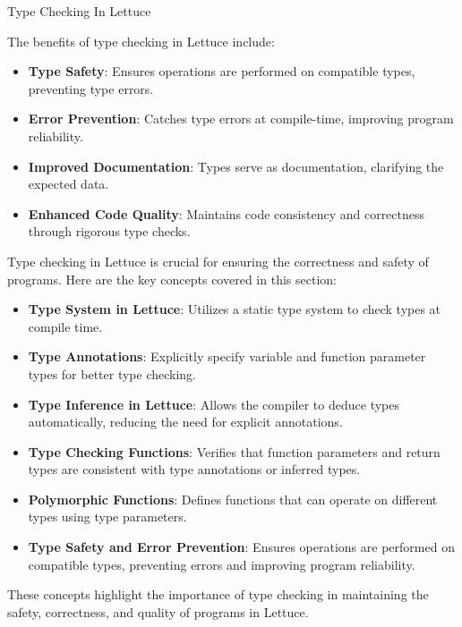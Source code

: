 \begin{notes}{Type Checking In Lettuce}
\begin{highlight}
        The benefits of type checking in Lettuce include:
    
        \begin{itemize}
            \item \textbf{Type Safety}: Ensures operations are performed on compatible types, preventing type errors.
            \item \textbf{Error Prevention}: Catches type errors at compile-time, improving program reliability.
            \item \textbf{Improved Documentation}: Types serve as documentation, clarifying the expected data.
            \item \textbf{Enhanced Code Quality}: Maintains code consistency and correctness through rigorous type checks.
        \end{itemize}
    
    \end{highlight}
    
    \begin{highlight}
    
        Type checking in Lettuce is crucial for ensuring the correctness and safety of programs. Here are the key concepts covered in this section:
    
        \begin{itemize}
            \item \textbf{Type System in Lettuce}: Utilizes a static type system to check types at compile time.
            \item \textbf{Type Annotations}: Explicitly specify variable and function parameter types for better type checking.
            \item \textbf{Type Inference in Lettuce}: Allows the compiler to deduce types automatically, reducing the need for explicit annotations.
            \item \textbf{Type Checking Functions}: Verifies that function parameters and return types are consistent with type annotations or inferred types.
            \item \textbf{Polymorphic Functions}: Defines functions that can operate on different types using type parameters.
            \item \textbf{Type Safety and Error Prevention}: Ensures operations are performed on compatible types, preventing errors and improving program reliability.
        \end{itemize}
    
        These concepts highlight the importance of type checking in maintaining the safety, correctness, and quality of programs in Lettuce.
    
    \end{highlight}
\end{notes}